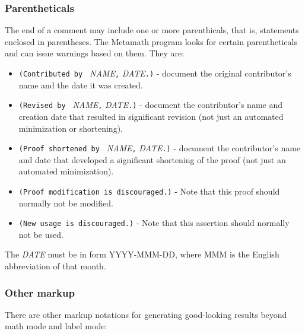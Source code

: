 \subsubsection{Parentheticals}\label{parentheticals}

The end of a comment may include one or more parenthicals, that is,
statements enclosed in parentheses.
The Metamath program looks for certain parentheticals and can issue
warnings based on them.
They are:

\begin{itemize}
 \item[] \texttt{(Contributed by }
   \textit{NAME}\texttt{,} \textit{DATE}\texttt{.)} -
   document the original contributor's name and the date it was created.
 \item[] \texttt{(Revised by }
   \textit{NAME}\texttt{,} \textit{DATE}\texttt{.)} -
   document the contributor's name and creation date
   that resulted in significant revision
   (not just an automated minimization or shortening).
 \item[] \texttt{(Proof shortened by }
   \textit{NAME}\texttt{,} \textit{DATE}\texttt{.)} -
   document the contributor's name and date that developed a significant
   shortening of the proof (not just an automated minimization).
 \item[] \texttt{(Proof modification is discouraged.)} -
   Note that this proof should normally not be modified.
 \item[] \texttt{(New usage is discouraged.)} -
   Note that this assertion should normally not be used.
\end{itemize}

The \textit{DATE} must be in form YYYY-MMM-DD, where MMM is the
English abbreviation of that month.

\subsubsection{Other markup}\label{othermarkup}

There are other markup notations for generating good-looking results
beyond math mode and label mode:

